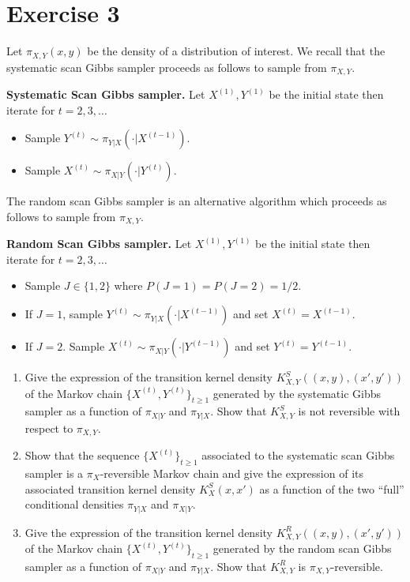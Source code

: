 \section*{Exercise 3}
Let $\pi_{X,Y} (x, y)$ be the density of a distribution of interest. We recall that the systematic scan Gibbs sampler proceeds as follows to sample from $\pi_{X,Y}$.

\textbf{Systematic Scan Gibbs sampler.} Let $X^{(1)}, Y^{(1)}$ be the initial state then iterate for $t = 2, 3, \ldots$
\begin{itemize}
\item Sample $Y^{(t)} \sim \pi_{Y |X}\left(\cdot| X^{(t-1)}\right)$.
\item Sample $X^{(t)} \sim \pi_{X|Y}\left(\cdot| Y^{(t)}\right)$.
\end{itemize}

The random scan Gibbs sampler is an alternative algorithm which proceeds as follows to sample from $\pi_{X,Y}$.

\textbf{Random Scan Gibbs sampler.} Let $X^{(1)}, Y^{(1)}$ be the initial state then iterate for $t = 2, 3, \ldots$
\begin{itemize}
\item Sample $J \in \{1, 2\}$ where $P (J = 1) = P (J = 2) = 1/2$.
\item If $J = 1$, sample $Y^{(t)} \sim \pi_{Y |X}\left(\cdot| X^{(t-1)}\right)$ and set $X^{(t)} = X^{(t-1)}$.
\item If $J = 2$. Sample $X^{(t)} \sim \pi_{X|Y}\left(\cdot| Y^{(t-1)}\right)$ and set $Y^{(t)} = Y^{(t-1)}$.
\end{itemize}

\begin{enumerate}
\item Give the expression of the transition kernel density $K^S_{X,Y} ((x, y),(x', y'))$ of the Markov chain $\{X^{(t)}, Y^{(t)}\}_{t\geq1}$ generated by the systematic Gibbs sampler as a function of $\pi_{X|Y}$ and $\pi_{Y |X}$. Show that $K^S_{X,Y}$ is not reversible with respect to $\pi_{X,Y}$.

\item Show that the sequence $\{X^{(t)}\}_{t\geq1}$ associated to the systematic scan Gibbs sampler is a $\pi_X$-reversible Markov chain and give the expression of its associated transition kernel density $K^S_X (x, x')$ as a function of the two ``full'' conditional densities $\pi_{Y |X}$ and $\pi_{X|Y}$.

\item Give the expression of the transition kernel density $K^R_{X,Y} ((x, y),(x', y'))$ of the Markov chain $\{X^{(t)}, Y^{(t)}\}_{t\geq1}$ generated by the random scan Gibbs sampler as a function of $\pi_{X|Y}$ and $\pi_{Y |X}$. Show that $K^R_{X,Y}$ is $\pi_{X,Y}$-reversible.
\end{enumerate}

